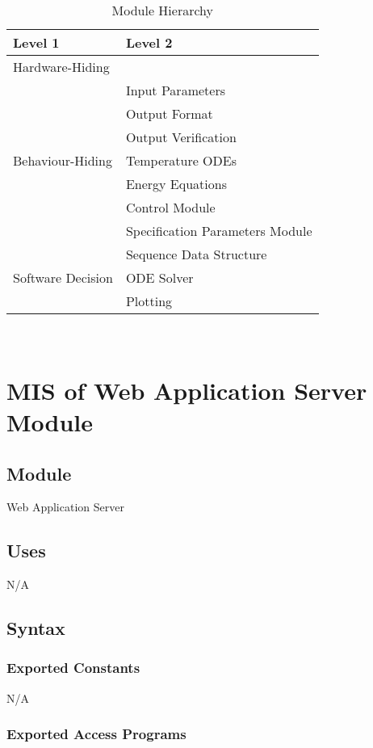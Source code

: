 \documentclass[12pt, titlepage]{article}
\begin{document}
\begin{table}[h!]
\centering
\begin{tabular}{p{} p{}}
\toprule
\textbf{Level 1} & \textbf{Level 2}\\
\midrule

{Hardware-Hiding} & ~ \\
\midrule

\multirow{7}{0.3\textwidth}{Behaviour-Hiding} & Input Parameters\\
& Output Format\\
& Output Verification\\
& Temperature ODEs\\
& Energy Equations\\ 
& Control Module\\
& Specification Parameters Module\\
\midrule

\multirow{3}{0.3\textwidth}{Software Decision} & {Sequence Data Structure}\\
& ODE Solver\\
& Plotting\\
\bottomrule

\end{tabular}
\caption{Module Hierarchy}
\label{TblMH}
\end{table}

\newpage
~\newpage
\section{MIS of Web Application Server Module} 

\subsection{Module}
Web Application Server   
\subsection{Uses}
N/A
\subsection{Syntax}
\subsubsection{Exported Constants}
N/A
\subsubsection{Exported Access Programs}
\end{document}
